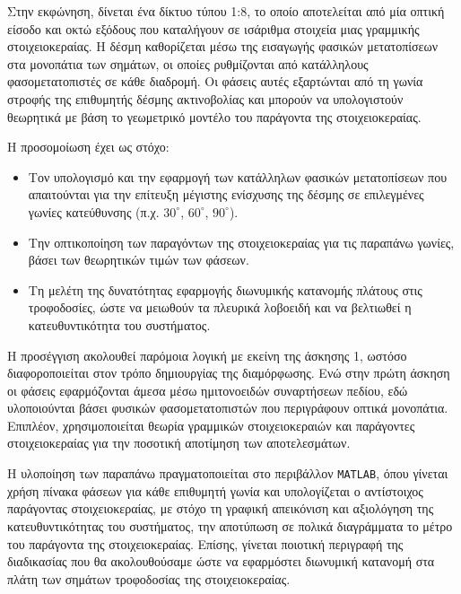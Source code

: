 \documentclass[a4paper,12pt]{report}
\newcommand{\en}{\selectlanguage{english}}
\newcommand{\gr}{\selectlanguage{greek}}
\begin{document}
\vspace{0.3cm}

\hspace{-0.6cm}Στην εκφώνηση, δίνεται ένα δίκτυο τύπου 1:8, το οποίο αποτελείται από μία οπτική είσοδο και οκτώ εξόδους που καταλήγουν σε ισάριθμα στοιχεία μιας γραμμικής στοιχειοκεραίας. Η δέσμη καθορίζεται μέσω της εισαγωγής φασικών μετατοπίσεων στα μονοπάτια των σημάτων, οι οποίες ρυθμίζονται από κατάλληλους φασομετατοπιστές σε κάθε διαδρομή. Οι φάσεις αυτές εξαρτώνται από τη γωνία στροφής της επιθυμητής δέσμης ακτινοβολίας και μπορούν να υπολογιστούν θεωρητικά με βάση το γεωμετρικό μοντέλο του παράγοντα της στοιχειοκεραίας.

\vspace{0.3cm}

\hspace{-0.6cm}Η προσομοίωση έχει ως στόχο:

\begin{itemize}
    \item Τον υπολογισμό και την εφαρμογή των κατάλληλων φασικών μετατοπίσεων που απαιτούνται για την επίτευξη μέγιστης ενίσχυσης της δέσμης σε επιλεγμένες γωνίες κατεύθυνσης (π.χ. \(30^\circ\), \(60^\circ\), \(90^\circ\)).
    \item Την οπτικοποίηση των παραγόντων της στοιχειοκεραίας για τις παραπάνω γωνίες, βάσει των θεωρητικών τιμών των φάσεων.
    \item Τη μελέτη της δυνατότητας εφαρμογής διωνυμικής κατανομής πλάτους στις τροφοδοσίες, ώστε να μειωθούν τα πλευρικά λοβοειδή και να βελτιωθεί η κατευθυντικότητα του συστήματος.
\end{itemize}

\hspace{-0.6cm}Η προσέγγιση ακολουθεί παρόμοια λογική με εκείνη της άσκησης 1, ωστόσο διαφοροποιείται στον τρόπο δημιουργίας της διαμόρφωσης. Ενώ στην πρώτη άσκηση οι φάσεις εφαρμόζονται άμεσα μέσω ημιτονοειδών συναρτήσεων πεδίου, εδώ υλοποιούνται βάσει φυσικών φασομετατοπιστών που περιγράφουν οπτικά μονοπάτια. Επιπλέον, χρησιμοποιείται θεωρία γραμμικών στοιχειοκεραιών και παράγοντες στοιχειοκεραίας για την ποσοτική αποτίμηση των αποτελεσμάτων.

\hspace{-0.6cm}Η υλοποίηση των παραπάνω πραγματοποιείται στο περιβάλλον \en \texttt{MATLAB}\gr, όπου γίνεται χρήση πίνακα φάσεων για κάθε επιθυμητή γωνία και υπολογίζεται ο αντίστοιχος παράγοντας στοιχειοκεραίας, με στόχο τη γραφική απεικόνιση και αξιολόγηση της κατευθυντικότητας του συστήματος, την αποτύπωση σε πολικά διαγράμματα το μέτρο του παράγοντα της στοιχειοκεραίας. Επίσης, γίνεται ποιοτική περιγραφή της διαδικασίας που θα ακολουθούσαμε ώστε να εφαρμόστει διωνυμική κατανομή στα πλάτη των σημάτων τροφοδοσίας της στοιχειοκεραίας.
\end{document}
